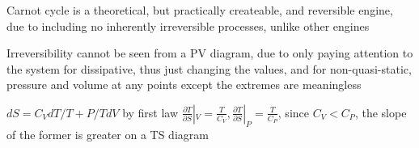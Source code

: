 Carnot cycle is a theoretical, but practically createable, and reversible engine, due to including no inherently irreversible processes, unlike other engines

Irreversibility cannot be seen from a PV diagram, due to only paying attention to the system for dissipative, thus just changing the values, and for non-quasi-static, pressure and volume at any points except the extremes are meaningless

$dS = C_V dT/T + P/T dV$ by first law
$\frac{\partial T}{\partial S}|_V = \frac{T}{C_V}, \frac{\partial T}{\partial S}|_P = \frac{T}{C_P}$, since $C_V < C_P$, the slope of the former is greater on a TS diagram 